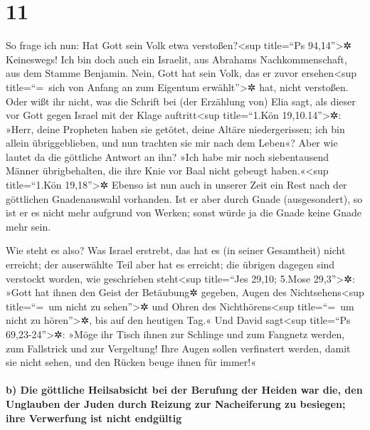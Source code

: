 \hypertarget{section-10}{%
\section{11}\label{section-10}}

 So frage ich nun: Hat Gott sein Volk etwa
verstoßen?\textless sup title=``Ps 94,14''\textgreater✲ Keineswegs! Ich
bin doch auch ein Israelit, aus Abrahams Nachkommenschaft, aus dem
Stamme Benjamin.  Nein, Gott hat sein Volk, das er zuvor
ersehen\textless sup title=``=~sich von Anfang an zum Eigentum
erwählt''\textgreater✲ hat, nicht verstoßen. Oder wißt ihr nicht, was
die Schrift bei (der Erzählung von) Elia sagt, als dieser vor Gott gegen
Israel mit der Klage auftritt\textless sup title=``1.Kön
19,10.14''\textgreater✲:  »Herr, deine Propheten haben sie
getötet, deine Altäre niedergerissen; ich bin allein übriggeblieben, und
nun trachten sie mir nach dem Leben«?  Aber wie lautet da
die göttliche Antwort an ihn? »Ich habe mir noch siebentausend Männer
übrigbehalten, die ihre Knie vor Baal nicht gebeugt haben.«\textless sup
title=``1.Kön 19,18''\textgreater✲  Ebenso ist nun auch in
unserer Zeit ein Rest nach der göttlichen Gnadenauswahl vorhanden.
 Ist er aber durch Gnade (ausgesondert), so ist er es
nicht mehr aufgrund von Werken; sonst würde ja die Gnade keine Gnade
mehr sein.

 Wie steht es also? Was Israel erstrebt, das hat es (in
seiner Gesamtheit) nicht erreicht; der auserwählte Teil aber hat es
erreicht; die übrigen dagegen sind verstockt worden,  wie
geschrieben steht\textless sup title=``Jes 29,10; 5.Mose
29,3''\textgreater✲: »Gott hat ihnen den Geist der Betäubung✲ gegeben,
Augen des Nichtsehens\textless sup title=``=~um nicht zu
sehen''\textgreater✲ und Ohren des Nichthörens\textless sup title=``=~um
nicht zu hören''\textgreater✲, bis auf den heutigen Tag.« 
Und David sagt\textless sup title=``Ps 69,23-24''\textgreater✲: »Möge
ihr Tisch ihnen zur Schlinge und zum Fangnetz werden, zum Fallstrick und
zur Vergeltung!  Ihre Augen sollen verfinstert werden,
damit sie nicht sehen, und den Rücken beuge ihnen für immer!«

\hypertarget{b-die-guxf6ttliche-heilsabsicht-bei-der-berufung-der-heiden-war-die-den-unglauben-der-juden-durch-reizung-zur-nacheiferung-zu-besiegen-ihre-verwerfung-ist-nicht-endguxfcltig}{%
\paragraph{b) Die göttliche Heilsabsicht bei der Berufung der Heiden war
die, den Unglauben der Juden durch Reizung zur Nacheiferung zu besiegen;
ihre Verwerfung ist nicht
endgültig}\label{b-die-guxf6ttliche-heilsabsicht-bei-der-berufung-der-heiden-war-die-den-unglauben-der-juden-durch-reizung-zur-nacheiferung-zu-besiegen-ihre-verwerfung-ist-nicht-endguxfcltig}}

